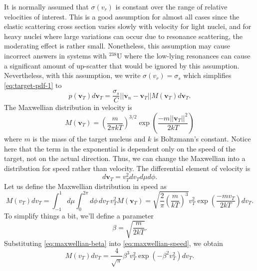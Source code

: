 It is normally assumed that $\sigma (v_r)$ is constant over the range of
relative velocities of interest. This is a good assumption for almost all cases
since the elastic scattering cross section varies slowly with velocity for light
nuclei, and for heavy nuclei where large variations can occur due to resonance
scattering, the moderating effect is rather small. Nonetheless, this assumption
may cause incorrect answers in systems with $^{238}$U where the low-lying
resonances can cause a significant amount of up-scatter that would be ignored by
this assumption. Nevertheless, with this assumption, we write $\sigma (v_r) =
\sigma_s$ which simplifies \eqref{eq:target-pdf-1} to
\begin{equation}
  \label{eq:target-pdf-2}
  p( \mathbf{v}_T ) d\mathbf{v}_T = \frac{\sigma_s}{C} || \mathbf{v}_n -
  \mathbf{v}_T || M ( \mathbf{v}_T ) d\mathbf{v}_T.
\end{equation}
The Maxwellian distribution in velocity is
\begin{equation}
  \label{eq:maxwellian-velocity}
  M (\mathbf{v}_T) = \left ( \frac{m}{2\pi kT} \right )^{3/2} \exp \left (
  \frac{-m || \mathbf{v}_T ||^2}{2kT} \right )
\end{equation}
where $m$ is the mass of the target nucleus and $k$ is Boltzmann's
constant. Notice here that the term in the exponential is dependent only on the
speed of the target, not on the actual direction. Thus, we can change the
Maxwellian into a distribution for speed rather than velocity. The differential
element of velocity is
\begin{equation}
  \label{eq:differential-velocity}
  d\mathbf{v}_T = v_T^2 dv_T d\mu d\phi.
\end{equation}
Let us define the Maxwellian distribution in speed as
\begin{equation}
  \label{eq:maxwellian-speed}
  M (v_T) dv_T = \int_{-1}^1 d\mu \int_{0}^{2\pi} d\phi \, dv_T \, v_T^2
  M(\mathbf{v}_T) = \sqrt{ \frac{2}{\pi} \left ( \frac{m}{kT} \right )^3}
  v_T^2 \exp \left ( \frac{-m v_T}{2kT} \right ) dv_T.
\end{equation}
To simplify things a bit, we'll define a parameter
\begin{equation}
  \label{eq:maxwellian-beta}
  \beta = \sqrt{\frac{m}{2kT}}.
\end{equation}
Substituting \eqref{eq:maxwellian-beta} into \eqref{eq:maxwellian-speed}, we
obtain
\begin{equation}
  \label{eq:maxwellian-speed2}
  M (v_T) dv_T = \frac{4}{\sqrt{\pi}} \beta^3 v_T^2 \exp \left ( -\beta^2
  v_T^2 \right ) dv_T.
\end{equation}

